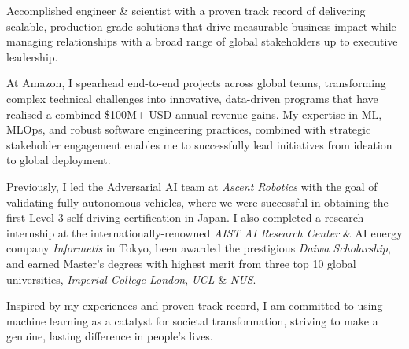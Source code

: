 

\begin{cvparagraph}

Accomplished engineer \& scientist with a proven track record of delivering scalable, production-grade solutions that drive measurable business impact while managing relationships with a broad range of global stakeholders up to executive leadership.

At Amazon, I spearhead end-to-end projects across global teams, transforming complex technical challenges into innovative, data-driven programs that have realised a combined \$100M+ USD annual revenue gains. My expertise in ML, MLOps, and robust software engineering practices, combined with strategic stakeholder engagement enables me to successfully lead initiatives from ideation to global deployment.

Previously, I led the Adversarial AI team at \emph{Ascent Robotics} with the goal of validating fully autonomous vehicles, where we were successful in obtaining the first Level 3 self-driving certification in Japan. I also completed a research internship at the internationally-renowned \emph{AIST AI Research Center} \& AI energy company \textit{Informetis} in Tokyo, been awarded the prestigious \emph{Daiwa Scholarship}, and earned Master's degrees with highest merit from three top 10 global universities, \textit{Imperial College London}, \textit{UCL} \& \textit{NUS}. 

Inspired by my experiences and proven track record, I am committed to using machine learning as a catalyst for societal transformation, striving to make a genuine, lasting difference in people's lives.



\end{cvparagraph}